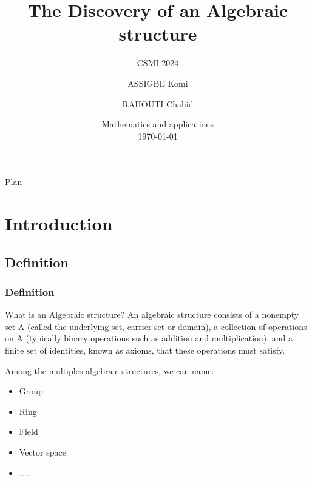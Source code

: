 \documentclass{beamer}
\title{The Discovery of an  Algebraic structure}
\subtitle{CSMI 2024}
\author[ASSIGBE Komi . RAHOUTI Chahid .]{ASSIGBE Komi \and  RAHOUTI Chahid}
\institute[]{University of Strasbourg \\ \smallskip} %
\date[\today]{Mathematics and applications \\ \today} %
\begin{document}


\begin{frame}
    \titlepage %
    \end{frame}

\begin{frame}{Plan}
\tableofcontents
\end{frame}


\section{Introduction}



\subsection{Definition}
\begin{frame}
    \frametitle{Definition}
    What is an Algebraic structure? An algebraic structure consists of a nonempty set A (called the underlying set, carrier set or domain), a collection of operations on A (typically binary operations such as addition and multiplication), and a finite set of identities, known as axioms, that these operations must satisfy.

    Among the multiples algebraic structures, we can name:
    \begin{itemize}
        \item Group
        \item Ring
        \item Field
        \item Vector space
        \item .....
    \end{itemize}
\end{frame}

\end{document}
